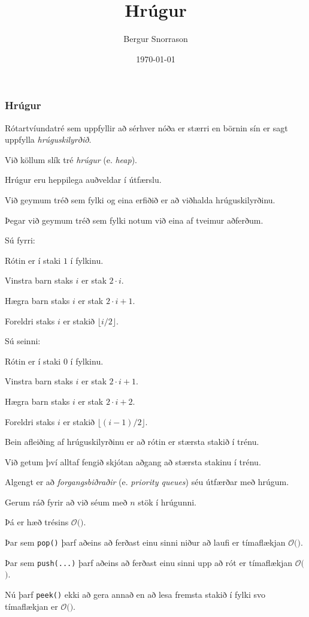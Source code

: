 \title{Hrúgur}
\author{Bergur Snorrason}
\date{\today}



\frame{\titlepage}

{
	\frametitle{Hrúgur}
	{
		\item<1-> Rótartvíundatré sem uppfyllir að sérhver nóða er stærri en börnin sín er sagt uppfylla \emph{hrúguskilyrðið}.
		\item<2-> Við köllum slík tré \emph{hrúgur} (e. \emph{heap}).
		\item<3-> Hrúgur eru heppilega auðveldar í útfærslu.
		\item<4-> Við geymum tréð sem fylki og eina erfiðið er að viðhalda hrúguskilyrðinu.
	}
}

{
	{
		\item<1-> Þegar við geymum tréð sem fylki notum við eina af tveimur aðferðum.
		\item<2-> Sú fyrri:
		{
			\item<3-> Rótin er í staki $1$ í fylkinu.
			\item<4-> Vinstra barn staks $i$ er stak $2 \cdot i$.
			\item<5-> Hægra barn staks $i$ er stak $2 \cdot i + 1$.
			\item<6-> Foreldri staks $i$ er stakið $\lfloor i/2 \rfloor$.
		}
		\item<7-> Sú seinni:
		{
			\item<8-> Rótin er í staki $0$ í fylkinu.
			\item<9-> Vinstra barn staks $i$ er stak $2\cdot i + 1$.
			\item<10-> Hægra barn staks $i$ er stak $2\cdot i + 2$.
			\item<11-> Foreldri staks $i$ er stakið $\lfloor (i - 1)/2 \rfloor$.
		}
	}
}

{
	{
		\item<1-> Bein afleiðing af hrúguskilyrðinu er að rótin er stærsta stakið í trénu.
		\item<2-> Við getum því alltaf fengið skjótan aðgang að stærsta stakinu í trénu.
		\item<3-> Algengt er að \emph{forgangsbiðraðir} (e. \emph{priority queues}) séu útfærðar með hrúgum.
	}
}

{
}

{
	{
		\item<1-> Gerum ráð fyrir að við séum með $n$ stök í hrúgunni.
		\item<2-> Þá er hæð trésins $\mathcal{O}($\onslide<3->{$\log n$}$)$.
		\item<4-> Þar sem \texttt{pop()} þarf aðeins að ferðast einu sinni niður að laufi er tímaflækjan
					$\mathcal{O}($\onslide<5->{$\log n$}$)$.
		\item<6-> Þar sem \texttt{push(...)} þarf aðeins að ferðast einu sinni upp að rót er tímaflækjan
					$\mathcal{O}($\onslide<7->{$\log n$}$)$.
		\item<8-> Nú þarf \texttt{peek()} ekki að gera annað en að lesa fremsta stakið í fylki svo tímaflækjan er
					$\mathcal{O}($\onslide<9->{$\,1\,$}$)$.
	}
}

{
}


